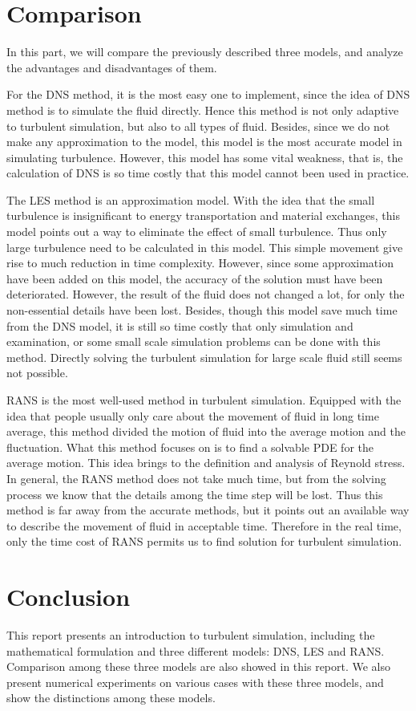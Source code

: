\documentclass[english, nochinese]{pkupaper}
\begin{document}
\section{Comparison}
\par In this part, we will compare the previously described three models, and analyze the advantages and disadvantages of them. 
\par For the DNS method, it is the most easy one to implement, since the idea of DNS method is to simulate the fluid directly. Hence this method is not only adaptive to turbulent simulation, but also to all types of fluid. Besides, since we do not make any approximation to the model, this model is the most accurate model in simulating turbulence. However, this model has some vital weakness, that is, the calculation of DNS is so time costly that this model cannot been used in practice.
\par The LES method is an approximation model. With the idea that the small turbulence is insignificant to energy transportation and material exchanges, this model points out a way to eliminate the effect of small turbulence. Thus only large turbulence need to be calculated in this model. This simple movement give rise to much reduction in time complexity. However, since some approximation have been added on this model, the accuracy of the solution must have been deteriorated. However, the result of the fluid does not changed a lot, for only the non-essential details have been lost. Besides, though this model save much time from the DNS model, it is still so time costly that only simulation and examination, or some small scale simulation problems can be done with this method. Directly solving the turbulent simulation for large scale fluid still seems not possible.
\par RANS is the most well-used method in turbulent simulation. Equipped with the idea that people usually only care about the movement of fluid in long time average, this method divided the motion of fluid into the average motion and the fluctuation. What this method focuses on is to find a solvable PDE for the average motion. This idea brings to the definition and analysis of Reynold stress. In general, the RANS method does not take much time, but from the solving process we know that the details among the time step will be lost. Thus this method is far away from the accurate methods, but it points out an available way to describe the movement of fluid in acceptable time. Therefore in the real time, only the time cost of RANS permits us to find solution for turbulent simulation. 

\section{Conclusion}
\par This report presents an introduction to turbulent simulation, including the mathematical formulation and three different models: DNS, LES and RANS. Comparison among these three models are also showed in this report. We also present numerical experiments on various cases with these three models, and show the distinctions among these models.
\end{document}
